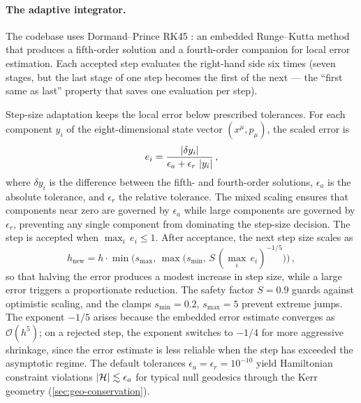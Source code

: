 \paragraph{The adaptive integrator.}

The codebase uses Dormand--Prince RK45 \cite{DormandPrince1980}: an
embedded Runge--Kutta method that produces a fifth-order solution and
a fourth-order companion for local error estimation.  Each accepted
step evaluates the right-hand side six times (seven stages, but the
last stage of one step becomes the first of the next --- the
``first same as last'' property that saves one evaluation per step).

Step-size adaptation keeps the local error below prescribed
tolerances.  For each component $y_i$ of the eight-dimensional state
vector $(x^\mu, p_\mu)$, the scaled error is
%
\begin{equation}
  e_i = \frac{\left\lvert \delta y_i \right\rvert}
    {\epsilon_a + \epsilon_r\,\left\lvert y_i \right\rvert} \,,
  \label{eq:rk45-error}
\end{equation}
%
where $\delta y_i$ is the difference between the fifth- and
fourth-order solutions, $\epsilon_a$ is the absolute tolerance, and
$\epsilon_r$ the relative tolerance.  The mixed scaling ensures that
components near zero are governed by $\epsilon_a$ while large
components are governed by $\epsilon_r$, preventing any single
component from dominating the step-size decision.  The step is
accepted when $\max_i\,e_i \leq 1$.  After acceptance, the next
step size scales as
%
\begin{equation}
  h_{\text{new}} = h \cdot
    \min\!\bigl(s_{\max},\,
      \max\bigl(s_{\min},\,
        S\,(\max_i\,e_i)^{-1/5}\bigr)\bigr) \,,
  \label{eq:rk45-stepcontrol}
\end{equation}
%
so that halving the error produces a modest increase in step size,
while a large error triggers a proportionate reduction.  The safety
factor $S = 0.9$ guards against optimistic scaling, and the clamps
$s_{\min} = 0.2$, $s_{\max} = 5$ prevent extreme jumps.  The
exponent $-1/5$ arises because the embedded error estimate converges
as $\mathcal{O}(h^5)$; on a rejected step, the exponent switches
to $-1/4$ for more aggressive shrinkage, since the error estimate is
less reliable when the step has exceeded the asymptotic regime.
The default tolerances $\epsilon_a = \epsilon_r = 10^{-10}$ yield
Hamiltonian constraint violations $\left\lvert \mathcal{H} \right\rvert \lesssim \epsilon_a$
for typical null geodesics through the Kerr geometry
(\cref{sec:geo-conservation}).

